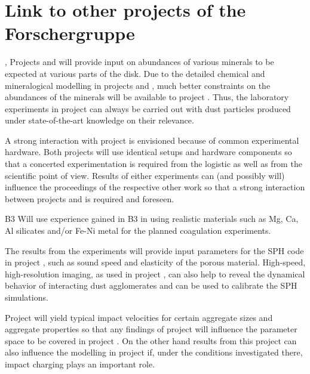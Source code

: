 \section{Link to other projects of the Forschergruppe}
\begin{linkproj}

\item[\projtscharn{},\projlattard{}] Projects \projtscharn{} and
\projlattard{} will provide input on abundances of various
minerals to be expected at various parts of the disk. Due to the
detailed chemical and mineralogical modelling in projects
\projtscharn{} and \projlattard{}, much better constraints on the
abundances of the minerals will be available to project
\projblum{}. Thus, the laboratory experiments in project
\projblum{} can always be carried out with dust particles produced
under state-of-the-art knowledge on their relevance.

\item[\projwurm{}] A strong interaction with project \projwurm{}
is envisioned because of common experimental hardware. Both
projects will use identical setups and hardware components so that
a concerted experimentation is required from the logistic as well
as from the scientific point of view. Results of either
experiments can (and possibly will) influence the proceedings of
the respective other work so that a strong interaction between
projects \projwurm{} and \projblum{} is required and foreseen.

\item[B3] Will use experience gained in B3
in using realistic materials such as Mg, Ca, Al silicates and/or Fe-Ni metal
for the planned coagulation experiments.

\item[\projkley{}] The results from the experiments  will provide
input parameters for the SPH code in project \projkley{}, such as
sound speed and elasticity of the porous material.
High-speed, high-resolution
imaging, as used in project \projblum{}, can also help to reveal
the dynamical behavior of interacting dust agglomerates and can be
used to calibrate the SPH simulations.

\item[\projklahr{}] Project \projklahr{} will yield typical impact
velocities for certain aggregate sizes and aggregate properties so
that any findings of project \projklahr{} will influence the
parameter space to be covered in project \projblum{}. On the other
hand results from this project can also influence the modelling in
project \projklahr{} if, under the conditions investigated there,
impact charging plays an important role.


\end{linkproj}
